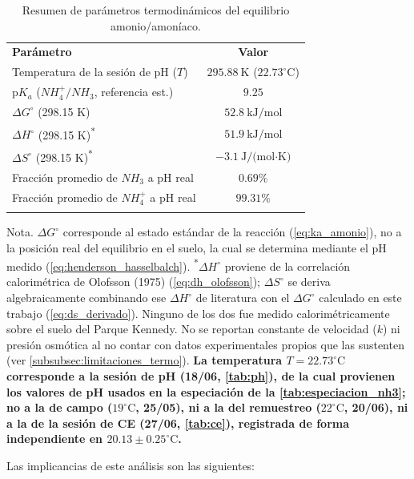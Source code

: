 \documentclass[fleqn]{jaes}
\begin{document}
\begin{table}[!ht]
\centering
\small
\caption{Resumen de parámetros termodinámicos del equilibrio amonio/amoníaco.}\label{tab:termodinamica_cinetica}
\begin{tabular}{@{}p{5.2cm}c@{}}
\toprule
\textbf{Parámetro} & \textbf{Valor} \\
\colrule
Temperatura de la sesión de pH ($T$) & $295.88~\text{K}$ ($22.73^\circ\text{C}$) \\
p$K_a$ ($NH_4^+/NH_3$, referencia est.) & $9.25$ \\
$\Delta G^\circ$ (298.15 K) & $52.8~\text{kJ/mol}$ \\
$\Delta H^\circ$ (298.15 K)\textsuperscript{*} & $51.9~\text{kJ/mol}$ \\
$\Delta S^\circ$ (298.15 K)\textsuperscript{*} & $-3.1~\text{J/(mol·K)}$ \\
Fracción promedio de $NH_3$ a pH real & $0.69\%$ \\
Fracción promedio de $NH_4^+$ a pH real & $99.31\%$ \\
\botrule
\end{tabular}
\begin{tabnote}
Nota. $\Delta G^\circ$ corresponde al estado estándar de la reacción (\cref{eq:ka_amonio}), no a la posición real del equilibrio en el suelo, la cual se determina mediante el pH medido (\cref{eq:henderson_hasselbalch}). \textsuperscript{*}$\Delta H^\circ$ proviene de la correlación calorimétrica de Olofsson (1975) \cite{Olofsson1975} (\cref{eq:dh_olofsson}); $\Delta S^\circ$ se deriva algebraicamente combinando ese $\Delta H^\circ$ de literatura con el $\Delta G^\circ$ calculado en este trabajo (\cref{eq:ds_derivado}). Ninguno de los dos fue medido calorimétricamente sobre el suelo del Parque Kennedy. No se reportan constante de velocidad ($k$) ni presión osmótica al no contar con datos experimentales propios que las sustenten (ver \cref{subsubsec:limitaciones_termo}). \textbf{La temperatura $T=22.73^\circ\text{C}$ corresponde a la sesión de pH (18/06, \cref{tab:ph}), de la cual provienen los valores de pH usados en la especiación de la \cref{tab:especiacion_nh3}; no a la de campo ($19^\circ\text{C}$, 25/05), ni a la del remuestreo ($22^\circ\text{C}$, 20/06), ni a la de la sesión de CE (27/06, \cref{tab:ce}), registrada de forma independiente en $20.13 \pm 0.25^\circ\text{C}$.}
\end{tabnote}
\end{table}

Las implicancias de este análisis son las siguientes:
\end{document}
